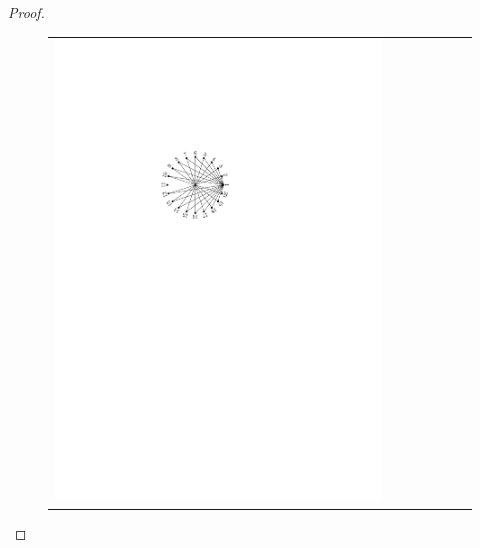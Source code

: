 \documentclass{patmorin}
\begin{document}
\begin{proof}
\begin{figure}
{\begin{tabular}{ccccccc}
       \includegraphics{figs/linear-lower-4} & 

\end{tabular}}
\end{figure}
\end{proof}
\end{document}
